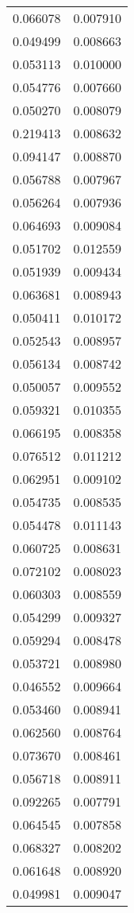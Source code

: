 \begin{longtable}[c]{ll}
    0.066078 & 0.007910 \\
    0.049499 & 0.008663 \\
    0.053113 & 0.010000 \\
    0.054776 & 0.007660 \\
    0.050270 & 0.008079 \\
    0.219413 & 0.008632 \\
    0.094147 & 0.008870 \\
    0.056788 & 0.007967 \\
    0.056264 & 0.007936 \\
    0.064693 & 0.009084 \\
    0.051702 & 0.012559 \\
    0.051939 & 0.009434 \\
    0.063681 & 0.008943 \\
    0.050411 & 0.010172 \\
    0.052543 & 0.008957 \\
    0.056134 & 0.008742 \\
    0.050057 & 0.009552 \\
    0.059321 & 0.010355 \\
    0.066195 & 0.008358 \\
    0.076512 & 0.011212 \\
    0.062951 & 0.009102 \\
    0.054735 & 0.008535 \\
    0.054478 & 0.011143 \\
    0.060725 & 0.008631 \\
    0.072102 & 0.008023 \\
    0.060303 & 0.008559 \\
    0.054299 & 0.009327 \\
    0.059294 & 0.008478 \\
    0.053721 & 0.008980 \\
    0.046552 & 0.009664 \\
    0.053460 & 0.008941 \\
    0.062560 & 0.008764 \\
    0.073670 & 0.008461 \\
    0.056718 & 0.008911 \\
    0.092265 & 0.007791 \\
    0.064545 & 0.007858 \\
    0.068327 & 0.008202 \\
    0.061648 & 0.008920 \\
    0.049981 & 0.009047 \\

\end{longtable}
